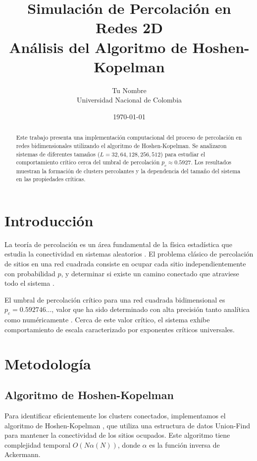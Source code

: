 \documentclass[11pt,a4paper]{article}
\title{Simulación de Percolación en Redes 2D\\
       Análisis del Algoritmo de Hoshen-Kopelman}
\author{Tu Nombre\\
        Universidad Nacional de Colombia}
\date{\today}
\begin{document}
\maketitle

\begin{abstract}
Este trabajo presenta una implementación computacional del proceso de percolación en redes bidimensionales utilizando el algoritmo de Hoshen-Kopelman. Se analizaron sistemas de diferentes tamaños ($L = 32, 64, 128, 256, 512$) para estudiar el comportamiento crítico cerca del umbral de percolación $p_c \approx 0.5927$. Los resultados muestran la formación de clusters percolantes y la dependencia del tamaño del sistema en las propiedades críticas.
\end{abstract}

\section{Introducción}

La teoría de percolación es un área fundamental de la física estadística que estudia la conectividad en sistemas aleatorios \cite{stauffer1994introduction}. El problema clásico de percolación de sitios en una red cuadrada consiste en ocupar cada sitio independientemente con probabilidad $p$, y determinar si existe un camino conectado que atraviese todo el sistema \cite{grimmett1999percolation}.

El umbral de percolación crítico para una red cuadrada bidimensional es $p_c = 0.592746...$, valor que ha sido determinado con alta precisión tanto analítica como numéricamente \cite{kesten1980critical}. Cerca de este valor crítico, el sistema exhibe comportamiento de escala caracterizado por exponentes críticos universales.

\section{Metodología}

\subsection{Algoritmo de Hoshen-Kopelman}

Para identificar eficientemente los clusters conectados, implementamos el algoritmo de Hoshen-Kopelman \cite{hoshen1976percolation}, que utiliza una estructura de datos Union-Find para mantener la conectividad de los sitios ocupados. Este algoritmo tiene complejidad temporal $O(N \alpha(N))$, donde $\alpha$ es la función inversa de Ackermann.
\end{document}

